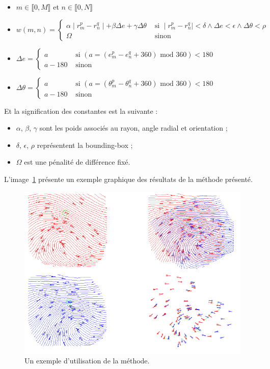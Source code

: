\documentclass{report}
\begin{document}
\begin{itemize}
\item $m \in \llbracket 0, M \rrbracket$ et $n \in \llbracket 0, N \rrbracket$
\item $w(m,n) = \left \{
    \begin{array}{ll}
      \alpha \mid r_{m}^p - r_{n}^q \mid + \beta \Delta e + \gamma \Delta \theta & \mbox { si } \mid r_{m}^p - r_{n}^q \mid < \delta \land \Delta e < \epsilon \land \Delta \theta < \rho \\
      \Omega & \mbox{ sinon}
    \end{array} \right .$
\item $\Delta e = \left \{
    \begin{array}{ll}
      a & \mbox { si } (a = (e_{m}^p - e_{n}^q + 360) \mbox{ mod } 360) < 180\\
      a - 180 & \mbox { sinon }
    \end{array} \right . $
\item $\Delta \theta = \left \{
    \begin{array}{ll}
      a & \mbox { si } (a = (\theta_{m}^p - \theta_{n}^q + 360) \mbox{ mod } 360) < 180\\
      a - 180 & \mbox { sinon }
    \end{array} \right . $
\end{itemize}

Et la signification des constantes est la suivante :
\begin{itemize}
\item $\alpha$, $\beta$, $\gamma$ sont les poids associés au rayon,
  angle radial et orientation ;
\item $\delta$, $\epsilon$, $\rho$ représentent la bounding-box ;
\item $\Omega$ est une pénalité de différence fixé.
\end{itemize}

L'image~\ref{fig:match} présente un exemple graphique des résultats de
la méthode présenté.

\begin{figure}
  \centering\includegraphics[scale=.4]{figres.png}
  \caption{Un exemple d'utilisation de la méthode.}
  \label{fig:match}
\end{figure}
\end{document}
